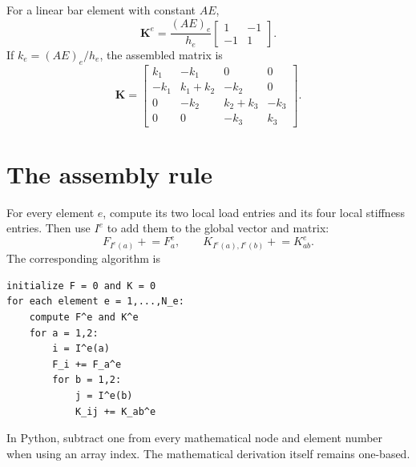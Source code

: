 \documentclass[11pt,letterpaper]{scrartcl}
\newcommand{\bK}{\bm{K}}
\begin{document}
For a linear bar element with constant $AE$,
\begin{equation}
\bK^e
=\frac{(AE)_e}{h_e}
\begin{bmatrix}1&-1\\-1&1\end{bmatrix}.
\label{eq:bar-element-matrix}
\end{equation}
If $k_e=(AE)_e/h_e$, the assembled matrix is
\begin{equation}
\bK=
\begin{bmatrix}
k_1&-k_1&0&0\\
-k_1&k_1+k_2&-k_2&0\\
0&-k_2&k_2+k_3&-k_3\\
0&0&-k_3&k_3
\end{bmatrix}.
\label{eq:assembled-bar-matrix}
\end{equation}

\section{The assembly rule}

For every element $e$, compute its two local load entries and its four local
stiffness entries. Then use $I^e$ to add them to the global vector and matrix:
\begin{equation}
\boxed{
F_{I^e(a)}\mathrel{+}=F_a^e,
\qquad
K_{I^e(a),I^e(b)}\mathrel{+}=K_{ab}^e.
}
\label{eq:assembly-rule}
\end{equation}
The corresponding algorithm is
{\small
\begin{verbatim}
initialize F = 0 and K = 0
for each element e = 1,...,N_e:
    compute F^e and K^e
    for a = 1,2:
        i = I^e(a)
        F_i += F_a^e
        for b = 1,2:
            j = I^e(b)
            K_ij += K_ab^e
\end{verbatim}
}

In Python, subtract one from every mathematical node and element number when
using an array index. The mathematical derivation itself remains one-based.
\end{document}
